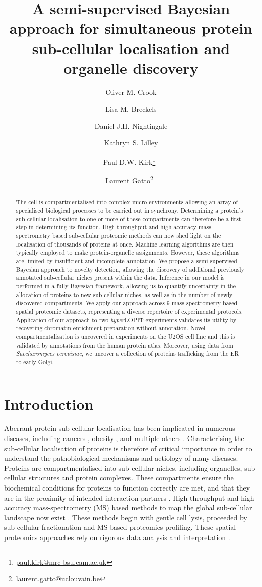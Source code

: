 \documentclass[12pt,english]{article}
\title{A semi-supervised Bayesian approach for simultaneous protein sub-cellular localisation and organelle discovery }
\author[1,2,3]{Oliver M. Crook}
\author[1,2]{Lisa M. Breckels}
\author[2]{Daniel J.H. Nightingale}
\author[2]{Kathryn S. Lilley}
\author[3]{Paul D.W. Kirk\thanks{\url{paul.kirk@mrc-bsu.cam.ac.uk}}~}
\author[4]{Laurent Gatto\thanks{\url{laurent.gatto@uclouvain.be}}~}
\affil[1]{Computational Proteomics Unit, Department of
	Biochemistry, University of Cambridge, Cambridge, UK}
\affil[2]{Cambridge Centre for Proteomics, Department of Biochemistry,
	University of Cambridge, Cambridge, UK}
\affil[3]{MRC Biostatistics Unit, Cambridge Institute for Public
	Health, Cambridge, UK}
\affil[4]{de Duve Institute, UCLouvain, Avenue
	Hippocrate 75, 1200 Brussels, Belgium}
\begin{document}
\maketitle

\begin{abstract}
The cell is compartmentalised into complex micro-environments allowing an array of
specialised biological processes to be carried out in synchrony. Determining a protein's sub-cellular localisation to one or more of these compartments can therefore be a first step in determining its function. High-throughput and high-accuracy mass spectrometry based sub-cellular proteomic methods can now shed light on the localisation of thousands of proteins at once. Machine learning algorithms are then typically employed to make protein-organelle assignments. However, these algorithms are limited by insufficient and incomplete annotation. We propose a semi-supervised Bayesian approach to novelty detection, allowing the discovery of additional previously annotated sub-cellular niches present within the data. Inference in our model is performed in a fully Bayesian framework, allowing us to quantify uncertainty in the allocation of proteins to new sub-cellular niches, as well as in the number of newly discovered compartments. We apply our approach across $9$ mass-spectrometry based spatial proteomic datasets, representing a diverse repertoire of experimental protocols. Application of our approach to two \textit{hyper}LOPIT experiments validates its utility by recovering chromatin enrichment preparation without annotation. Novel compartmentalisation is uncovered in experiments on the U2OS cell line and this is validated by annotations from the human protein atlas. Moreover, using data from \textit{Saccharomyces cerevisiae}, we uncover a collection of proteins trafficking from the ER to early Golgi.
\end{abstract}

\section{Introduction}
Aberrant protein sub-cellular localisation has been implicated in numerous diseases, including cancers \citep{Kau:2004}, obesity \citep{Siljee:2018}, and multiple others \citep{Laurila:2009}. Characterising the sub-cellular localisation of proteins is therefore of critical importance in order to understand the pathobiological mechanisms and aetiology of many diseases. Proteins are compartmentalised into sub-cellular niches, including organelles, sub-cellular structures and protein complexes. These compartments ensure the biochemical conditions for proteins to function correctly are met, and that they are in the proximity of intended interaction partners \citep{Gibson:2009}. High-throughput and high-accuracy mass-spectrometry (MS) based methods to map the global sub-cellular landscape now exist \citep{hyper, Mulvey:2017, DC:2018}. These methods begin with gentle cell lysis, proceeded by sub-cellular fractionation and MS-based proteomics profiling. These spatial proteomics approaches rely on rigorous data analysis and interpretation \citep{Gatto:2010, Gatto:2014b}.
\end{document}

